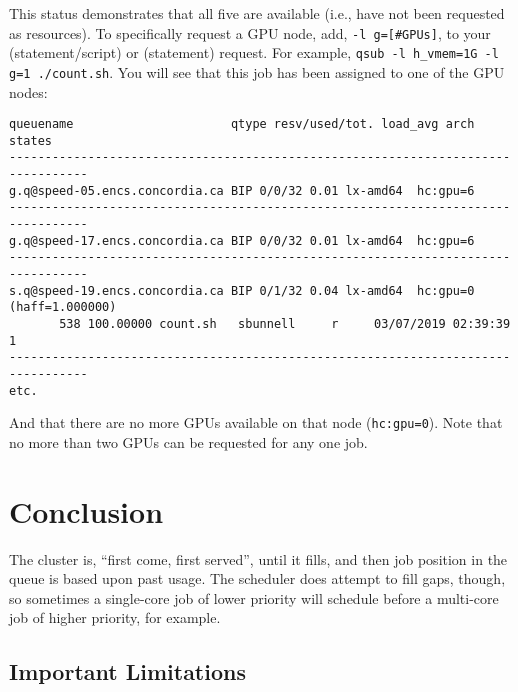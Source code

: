 \documentclass{easychair}
\begin{document}
This status demonstrates that all five are available (i.e., have not been 
requested as resources). To specifically request a GPU node, add,
\texttt{-l g=[\#GPUs]}, to your  (statement/script) or
 (statement) request. For example,
\texttt{qsub -l h\_vmem=1G -l g=1 ./count.sh}. You 
will see that this job has been assigned to one of the GPU nodes:

\small
\begin{verbatim}
queuename                      qtype resv/used/tot. load_avg arch          states
--------------------------------------------------------------------------------- 
g.q@speed-05.encs.concordia.ca BIP 0/0/32 0.01 lx-amd64  hc:gpu=6 
--------------------------------------------------------------------------------- 
g.q@speed-17.encs.concordia.ca BIP 0/0/32 0.01 lx-amd64  hc:gpu=6 
--------------------------------------------------------------------------------- 
s.q@speed-19.encs.concordia.ca BIP 0/1/32 0.04 lx-amd64  hc:gpu=0 (haff=1.000000) 
       538 100.00000 count.sh   sbunnell     r     03/07/2019 02:39:39     1
---------------------------------------------------------------------------------
etc. 
\end{verbatim}
\normalsize

And that there are no more GPUs available on that node (\texttt{hc:gpu=0}). Note that no 
more than two GPUs can be requested for any one job. 

\section{Conclusion}
\label{sect:conclusion}

The cluster is, ``first come, first served'', until it fills, and then job
position in the queue is based upon past usage. The scheduler does attempt
to fill gaps, though, so sometimes a single-core job of lower priority
will schedule before a multi-core job of higher priority, for example.

\subsection{Important Limitations}
\label{sect:limitations}
\end{document}
